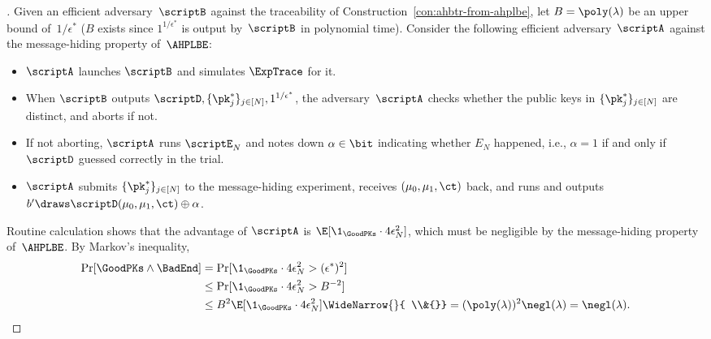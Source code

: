 \begin{proof}[]
Given an efficient adversary~$\scriptB$ against the traceability of Construction~\ref{con:ahbtr-from-ahplbe},
let ${B=\poly(\lambda)}$ be an upper bound of~$1/\epsilon^\ast$
($B$ exists since $1^{1/\epsilon^\ast}$ is output by~$\scriptB$ in polynomial time).
Consider the following efficient adversary~$\scriptA$ against the message-hiding property of~$\AHPLBE$:
\begin{itemize}
\item $\scriptA$ launches $\scriptB$ and simulates $\ExpTrace$ for it.
\item When $\scriptB$ outputs $\scriptD,\{\pk^\ast_j\}_{j\in[N]},1^{1/\epsilon^\ast}$,\WideNarrow{}{\rule[1.1em]{0pt}{0pt}}
the adversary~$\scriptA$ checks whether the public keys in $\{\pk^\ast_j\}_{j\in[N]}$ are distinct, and aborts if not.
\item If not aborting,\WideNarrow{}{\rule[0.9em]{0pt}{0pt}}
$\scriptA$ runs $\scriptE_N$ and
notes down ${\alpha\in\bit}$ indicating whether $E_N$ happened,
i.e., ${\alpha=1}$ if and only if $\scriptD$ guessed correctly in the trial.
\item $\scriptA$ submits $\{\pk^\ast_j\}_{j\in[N]}$ to the message-hiding experiment, receives $(\mu_0,\mu_1,\ct)$ back, and
runs and outputs ${b'\draws\scriptD(\mu_0,\mu_1,\ct)\oplus\alpha}$.
\end{itemize}
Routine calculation shows that the advantage of $\scriptA$ is
${\E[\1_\GoodPKs\cdot 4\epsilon_N^2]}$,
which must be negligible by the message-hiding property of~$\AHPLBE$.
By Markov's inequality,
\begin{align*}
\Pr[\GoodPKs\wedge\BadEnd]
&{}=
\Pr[\1_\GoodPKs\cdot 4\epsilon_N^2>(\epsilon^\ast)^2]
\\&{}\leq
\Pr[\1_\GoodPKs\cdot 4\epsilon_N^2>B^{-2}]
\\&{}\leq
B^2\E[\1_\GoodPKs\cdot 4\epsilon_N^2]
\WideNarrow{}{
\\&{}}
=
(\poly(\lambda))^2\negl(\lambda)
=
\negl(\lambda).
\qedhere
\end{align*}
\end{proof}
